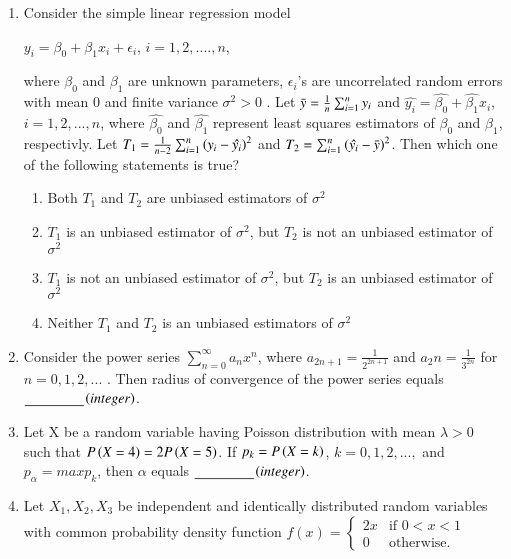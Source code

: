\documentclass[journal,12pt,onecolumn]{IEEEtran}
\theoremstyle{remark}
\begin{document}
\begin{enumerate}
\begin{enumerate}
     \end{enumerate}
\item Consider the simple linear regression model 
\begin{center}
    $y_i = {\beta}_0 + {\beta}_1 x_i + {\epsilon}_i$, $i=1,2,....,n$, 
\end{center}
where ${\beta}_0$ and ${\beta}_1$ are unknown parameters, ${\epsilon}_i$'s
 are uncorrelated random errors with mean 0 and finite variance ${\sigma}^2 > 0$ . Let $\Bar{y}= \frac{1}{n}\sum_{i=1}^n y_i$ and $\hat{y_i}=\hat{\beta_0}+\hat{\beta_1}x_i$,$i=1,2,...,n$, where $\hat{\beta_0}$ and $\hat{\beta_1}$ represent least squares estimators of $\beta_0$ and $\beta_1$, respectivly. Let $T_1 = \frac{1}{n-2}\sum_{i=1}^n \left(y_i -\hat{y_i}\right)^2$ and $T_2 = \sum_{i=1}^n\left(\hat{y_i}-\Bar{y}\right)^2$. Then which one of the following statements is true?
 \begin{enumerate}
     \item Both $T_1$ and $T_2$ are unbiased estimators of $\sigma^2$
     \item $T_1$ is an unbiased estimator of $\sigma^2$, but $T_2$ is not an unbiased estimator of $\sigma^2$
     \item $T_1$ is not an unbiased estimator of $\sigma^2$, but $T_2$ is an unbiased estimator of $\sigma^2$
     \item Neither $T_1$ and $T_2$ is an unbiased estimators of $\sigma^2$
 \end{enumerate}
 \item Consider the power series $\sum_{n=0}^\infty a_n x^n$, where $a_{2n+1}=\frac{1}{2^{2n+1}}$ and $a_2n = \frac{1}{3^{2n}}$ for $n=0,1,2,...$ . Then radius of convergence of the power series equals $\underline{\hspace{1.5 cm}}$$\left(integer\right)$.
 \item Let X be a random variable having Poisson distribution with mean $\lambda>0$    such that $P\left(X=4\right)=2P\left(X=5\right)$. If $p_k = P\left(X=k\right)$, $k=0,1,2,...,$ and $p_\alpha = max p_k$, then $\alpha$ equals $\underline{\hspace{1.5 cm}}$$\left(integer\right)$.
 \item Let $X_1,X_2,X_3$ be independent and identically distributed random variables with common probability density function 
  $f(x) = 
    \begin{cases} 
        2x & \text{if } 0 < x < 1 \\
        0 & \text{otherwise}.
    \end{cases}
    $
    

\end{enumerate}
\end{document}
